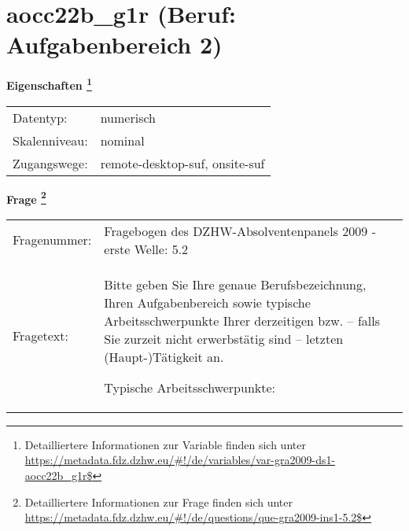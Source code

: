 
    \setcounter{footnote}{0}

    \vspace*{-1.8cm}
	\section{aocc22b\_g1r (Beruf: Aufgabenbereich 2)}
	\label{section:aocc22b_g1r}



    \vspace*{0.5cm}
    \noindent\textbf{Eigenschaften
	\footnote{Detailliertere Informationen zur Variable finden sich unter
		\url{https://metadata.fdz.dzhw.eu/\#!/de/variables/var-gra2009-ds1-aocc22b_g1r$}}}\\
	\begin{tabularx}{\hsize}{@{}lX}
	Datentyp: & numerisch \\
	Skalenniveau: & nominal \\
	Zugangswege: &
	  remote-desktop-suf, 
	  onsite-suf
 \\
    \end{tabularx}



				\vspace*{0.5cm}
                \noindent\textbf{Frage
	                \footnote{Detailliertere Informationen zur Frage finden sich unter
		              \url{https://metadata.fdz.dzhw.eu/\#!/de/questions/que-gra2009-ins1-5.2$}}}\\
				\begin{tabularx}{\hsize}{@{}lX}
					Fragenummer: &
					  Fragebogen des DZHW-Absolventenpanels 2009 - erste Welle:
					  5.2
 \\
					Fragetext: & Bitte geben Sie Ihre genaue Berufsbezeichnung, Ihren Aufgabenbereich sowie typische Arbeitsschwerpunkte Ihrer derzeitigen bzw. – falls Sie zurzeit nicht erwerbstätig sind – letzten (Haupt-)Tätigkeit an.\par  Typische Arbeitsschwerpunkte: \\
				\end{tabularx}





